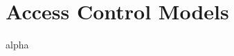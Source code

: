 \documentclass[a4paper]{report}
\begin{document}


\tableofcontents
\newpage

\chapter{Access Control Models}



\listoffigures
\printglossary[style=altlist,title=Glossar]

 {alpha}

\end{document}
